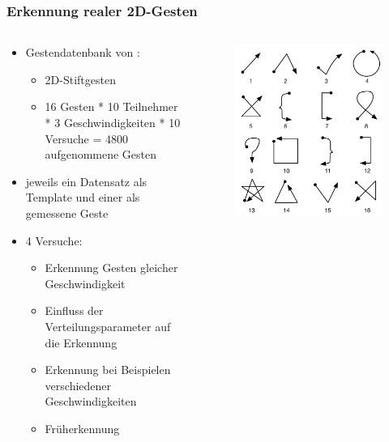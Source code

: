 \documentclass{beamer}
\begin{document}
\begin{frame}\frametitle{Erkennung realer 2D-Gesten}
\begin{columns}
\begin{column}{.6\textwidth}
\begin{itemize}
\item Gestendatenbank von \citet{Wobbrock2007}:
\begin{itemize}
\item 2D-Stiftgesten
\item 16 Gesten * 10 Teilnehmer * 3 Geschwindigkeiten * 10 Versuche = 4800 aufgenommene Gesten
\end{itemize}
\item jeweils ein Datensatz als Template und einer als gemessene Geste
\item 4 Versuche:
\begin{itemize}
\item Erkennung  Gesten gleicher Geschwindigkeit
\item Einfluss der Verteilungsparameter auf die Erkennung
\item Erkennung bei Beispielen verschiedener Geschwindigkeiten
\item Früherkennung
\end{itemize}
\end{itemize}
\end{column}
\begin{column}{.4\textwidth}
\begin{figure}
\centering
\includegraphics[width=\linewidth]{../Bilder/Fig3}
\label{fig:Fig3}
\end{figure}
\end{column}
\end{columns}
\end{frame}
\end{document}
